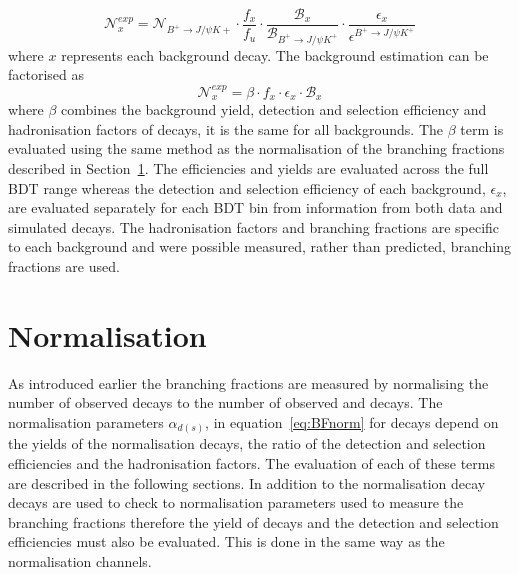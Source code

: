 {{{\begin{equation}
\mathcal{N}^{exp}_{x} = \mathcal{N}_{B^{+} \to J/\psi K{+}} \cdot \frac{f_{x}}{f_{u}} \cdot \frac{\mathcal{B}_{x}}{\mathcal{B}_{B^{+} \to J/\psi K^{+}}} \cdot \frac{\epsilon_{x}}{\epsilon^{B^{+} \to J/\psi K^{+}}} 
\label{eq:BkgndPredict}
\end{equation}
where $x$ represents each background decay. The background estimation can be factorised as
\begin{equation}
\mathcal{N}^{exp}_{x} = \beta \cdot f_{x} \cdot \epsilon_{x} \cdot \mathcal{B}_{x}
\label{eq:BkgndPredict2}
\end{equation}
where $\beta$ combines the background yield, detection and selection efficiency and hadronisation factors of \bujpsik decays, it is the same for all backgrounds. The $\beta$ term is evaluated using the same method as the normalisation of the \bmumu branching fractions described in Section~\ref{sec:Normalisation}. The \bujpisk efficiencies and yields are evaluated across the full BDT range whereas the detection and selection efficiency of each background, $ \epsilon_{x}$, are evaluated separately for each BDT bin from information from both data and simulated decays. The hadronisation factors and branching fractions are specific to each background and were possible measured, rather than predicted, branching fractions are used. %

\section{Normalisation}
\label{sec:Normalisation}

As introduced earlier the \bmumu branching fractions are measured by normalising the number of observed \bmumu decays to the number of observed \bujpsik and \bdkpi decays. 
The normalisation parameters $\alpha_{d(s)}$, in equation~\ref{eq:BFnorm} for \bmumu decays depend on the yields of the normalisation decays, the ratio of the detection and selection efficiencies and the hadronisation factors. The evaluation of each of these terms are described in the following sections.
In addition to the normalisation decay \bsjpsiphi decays are used to check to normalisation parameters used to measure the \bmumu branching fractions therefore the yield of \bsjpisphi decays and the detection and selection efficiencies must also be evaluated. This is done in the same way as the normalisation channels.


}}}
